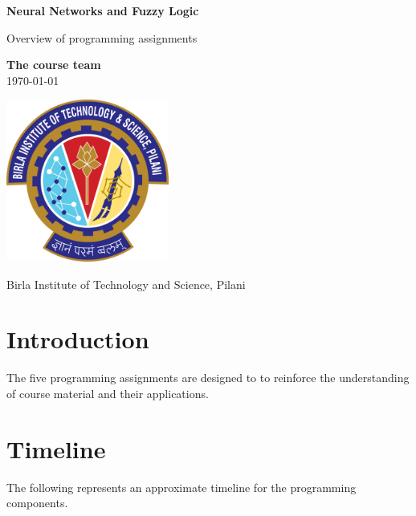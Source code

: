 \documentclass{article} %
\begin{document}
\begin{titlepage}
    \begin{center}
        \vspace*{1cm}

        \begin{huge}
            \textbf{Neural Networks and Fuzzy Logic}
        \end{huge}
        \LARGE{Overview of programming assignments}

        \vspace{4cm}

        \textbf{The course team}\\
        \today

        \vspace{2.5cm}

        \includegraphics[width=0.4\textwidth]{logo}
        \vspace{1cm}

        Birla Institute of Technology and Science, Pilani\\
        \vspace{0.5cm}
    \end{center}
\end{titlepage}


\tableofcontents

\vspace{10cm}

\section{Introduction}

The five programming assignments are designed to 
to reinforce the understanding of course material 
and their applications.

\section{Timeline}

The following represents an approximate timeline for the
programming components.
\end{document}
